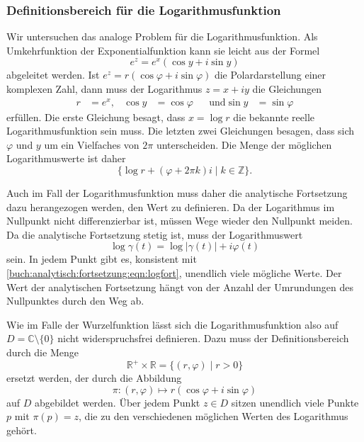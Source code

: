 \subsubsection{Definitionsbereich für die Logarithmusfunktion}
Wir untersuchen das analoge Problem für die Logarithmusfunktion.
Als Umkehrfunktion der Exponentialfunktion kann sie leicht aus
der Formel
\[
e^z
=
e^x(\cos y + i \sin y)
\]
abgeleitet werden.
Ist $e^z=r(\cos\varphi+i\sin\varphi)$ die Polardarstellung einer
komplexen Zahl, dann muss der Logarithmus $z=x+iy$ die Gleichungen
\begin{align*}
r&=e^x,
&
\cos y &= \cos\varphi
&&\text{und}
\sin y &= \sin\varphi
\end{align*}
erfüllen.
Die erste Gleichung besagt, dass $x=\log r$ die bekannte
reelle Logarithmusfunktion sein muss.
Die letzten zwei Gleichungen besagen, dass sich $\varphi$ und $y$
um ein Vielfaches von $2\pi$ unterscheiden.
Die Menge der möglichen Logarithmuswerte ist daher
\begin{equation}
\{
\log r
+
(\varphi
+
2\pi k)i
\mid
k\in\mathbb{Z}
\}.
\label{buch:analytisch:fortsetzung:eqn:logfort}
\end{equation}

Auch im Fall der Logarithmusfunktion muss daher die analytische
Fortsetzung dazu herangezogen werden, den Wert zu definieren.
Da der Logarithmus im Nullpunkt nicht differenzierbar ist, müssen
Wege wieder den Nullpunkt meiden.
Da die analytische Fortsetzung stetig ist, muss der Logarithmuswert
\[
\log\gamma(t)
=
\log|\gamma(t)| + i\varphi(t)
\]
sein.
In jedem Punkt gibt es, konsistent mit
\eqref{buch:analytisch:fortsetzung:eqn:logfort},
unendlich viele mögliche Werte.
Der Wert der analytischen Fortsetzung hängt von der Anzahl der
Umrundungen des Nullpunktes durch den Weg ab.

Wie im Falle der Wurzelfunktion lässt sich die Logarithmusfunktion
also auf $D=\mathbb{C}\setminus\{0\}$ nicht widerspruchsfrei
definieren.
Dazu muss der Definitionsbereich durch die Menge
\[
\mathbb{R}^+\times \mathbb{R}
=
\{
(r,\varphi)
\mid
r>0
\}
\]
ersetzt werden, der durch die Abbildung
\[
\pi
\colon
(r,\varphi)
\mapsto
r(\cos\varphi+i\sin\varphi)
\]
auf $D$ abgebildet werden.
Über jedem Punkt $z\in D$ sitzen unendlich viele Punkte $p$ mit
$\pi(p)=z$, die zu den verschiedenen möglichen Werten des Logarithmus
gehört.

%
%
